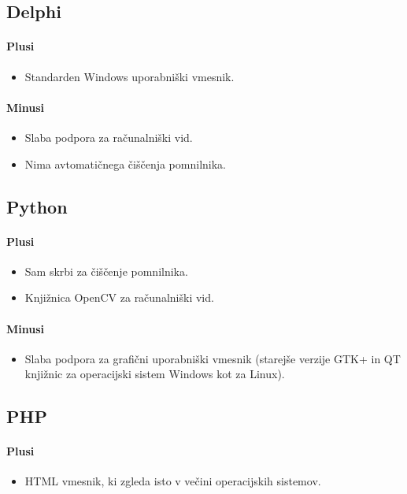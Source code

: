 \documentclass[oneside, a4paper, 12pt]{book}
\begin{document}
\subsection{Delphi}
\paragraph{Plusi}
\begin{itemize}
\item Standarden Windows uporabniški vmesnik.
\end{itemize}
\paragraph{Minusi}
\begin{itemize}
\item Slaba podpora za računalniški vid.
\item Nima avtomatičnega čiščenja pomnilnika.
\end{itemize}

\subsection{Python}
\paragraph{Plusi}
\begin{itemize}
\item Sam skrbi za čiščenje pomnilnika.
\item Knjižnica OpenCV za računalniški vid.
\end{itemize}
\paragraph{Minusi}
\begin{itemize}
\item Slaba podpora za grafični uporabniški vmesnik (starejše verzije GTK+ in QT knjižnic za operacijski sistem Windows kot za Linux).
\end{itemize}

\subsection{PHP}
\paragraph{Plusi}
\begin{itemize}
\item HTML vmesnik, ki zgleda isto v večini operacijskih sistemov.
\end{itemize}
\end{document}

